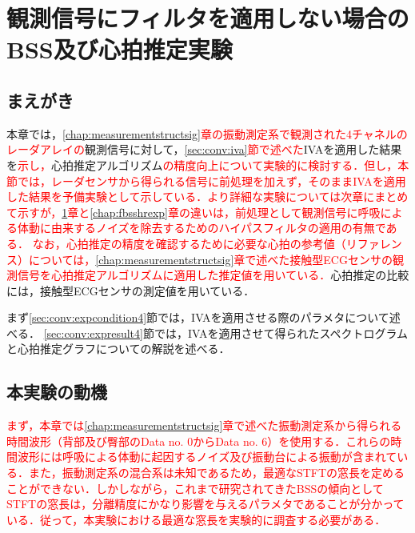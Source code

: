 \chapter{観測信号にフィルタを適用しない場合のBSS及び心拍推定実験}
\label{chap:bsshrexp}

\section{まえがき}
本章では，\textcolor{red}{\ref{chap:measurementstructsig}章の振動測定系で観測された4チャネルのレーダアレイの}観測信号に対して，\textcolor{red}{\ref{sec:conv:iva}節で述べた}IVAを適用した結果を\textcolor{red}{示し，}心拍推定アルゴリズム\textcolor{red}{の精度向上について実験的に検討する．但し，本節では，レーダセンサから得られる信号に前処理を加えず，そのままIVAを適用した結果を予備実験として示している．より詳細な実験については次章にまとめて示すが，\ref{chap:bsshrexp}章と\ref{chap:fbsshrexp}章の違いは，前処理として観測信号に呼吸による体動に由来するノイズを除去するためのハイパスフィルタの適用の有無である．}
\textcolor{red}{なお，心拍推定の精度を確認するために必要な心拍の参考値（リファレンス）については，\ref{chap:measurementstructsig}章で述べた接触型ECGセンサの観測信号を心拍推定アルゴリズムに適用した推定値を用いている．}心拍推定の比較には，接触型ECGセンサの測定値を用いている．

まず\ref{sec:conv:expcondition4}節では，IVAを適用させる際のパラメタについて述べる．
\ref{sec:conv:expresult4}節では，IVAを適用させて得られたスペクトログラムと心拍推定グラフについての解説を述べる．

\section{本実験の動機}
\label{sec:conv:expmotivation}
\textcolor{red}{まず，本章では\ref{chap:measurementstructsig}章で述べた振動測定系から得られる時間波形（背部及び臀部のData no. 0からData no. 6）を使用する．これらの時間波形には呼吸による体動に起因するノイズ及び振動台による振動が含まれている．また，振動測定系の混合系は未知であるため，最適なSTFTの窓長を定めることができない．しかしながら，これまで研究されてきたBSSの傾向としてSTFTの窓長は，分離精度にかなり影響を与えるパラメタであることが分かっている\cite{winlengthBSS}．従って，本実験における最適な窓長を実験的に調査する必要がある．}

